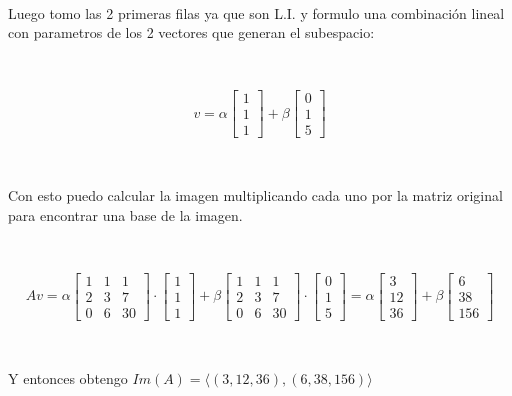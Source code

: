 \documentclass{article}
\begin{document}
\

\noindent Luego tomo las 2 primeras filas ya que son L.I. y formulo una combinación lineal con parametros 
de los 2 vectores que generan el subespacio:

\

\[v =  
\alpha\begin{bmatrix}
    1 \\
    1 \\
    1
\end{bmatrix}
+
\beta\begin{bmatrix}
    0 \\ 
    1 \\
    5
\end{bmatrix}
\]

\

\noindent Con esto puedo calcular la imagen multiplicando cada uno por la matriz original para encontrar una base de la imagen.

\

\[Av = 
\alpha\begin{bmatrix}
    1 & 1 & 1 \\
    2 & 3 & 7 \\
    0 & 6 & 30
\end{bmatrix}\cdot
\begin{bmatrix}
    1 \\
    1 \\
    1
\end{bmatrix}
+
\beta\begin{bmatrix}
    1 & 1 & 1 \\
    2 & 3 & 7 \\
    0 & 6 & 30
\end{bmatrix}\cdot
\begin{bmatrix}
    0 \\
    1 \\
    5
\end{bmatrix}
=
\alpha\begin{bmatrix}
    3 \\
    12 \\
    36
\end{bmatrix}
+
\beta\begin{bmatrix}
    6 \\
    38 \\
    156
\end{bmatrix}
\]

\

\noindent Y entonces obtengo $Im(A) = \langle (3,12,36), (6, 38, 156) \rangle$
\end{document}
